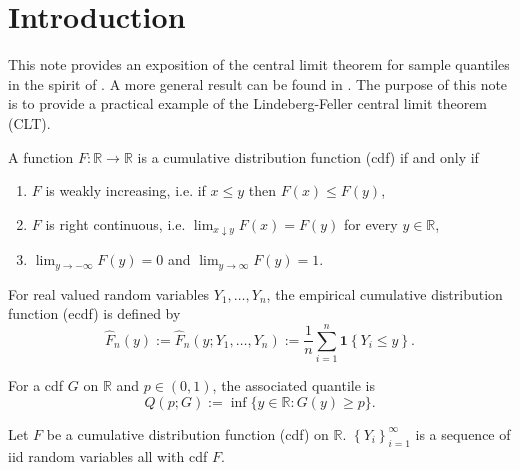 
\section{Introduction}

This note provides an exposition of the central limit theorem for sample
quantiles in the spirit of \citet[Example 24,
p. 53]{1984pollardConvergenceStochasticProcesses}.
A more general result can be found in \citet[Section
2.3.3, pp. 77-84]{1980serflingApproximationTheoremsMathematical}.
The purpose of this note is to provide a practical example of the
Lindeberg-Feller central limit theorem (CLT).

\begin{definition}
A function \(F : \mathbb{R} \to \mathbb{R}\) is a cumulative distribution
function (cdf) if and only if
\begin{enumerate}
  \item \(F\) is weakly increasing, i.e. if \(x \leq y\) then \(F (x) \leq F
    (y)\),
  \item \(F\) is right continuous, i.e. \(\lim_{x \downarrow y} F (x) = F (y)\)
    for every \(y \in \mathbb{R}\),
  \item \(\lim_{y \to - \infty} F (y) = 0\) and \(\lim_{y \to \infty} F (y) =
    1\).
\end{enumerate}
\end{definition}

\begin{definition}
For real valued random variables \(Y_{1}, \dots, Y_{n}\), the empirical
cumulative distribution function (ecdf) is defined by
\begin{equation*}
  \widehat{F}_{n} (y) := \widehat{F}_{n} \left( y; Y_{1}, \dots, Y_{n} \right)
  := \frac{1}{n} \sum_{i = 1}^{n} \mathbf{1} \left\{ Y_{i} \leq y \right\}.
\end{equation*}
\end{definition}

\begin{definition}
For a cdf \(G\) on \(\mathbb{R}\) and \(p \in (0, 1)\), the associated quantile
is
\begin{equation*}
  Q (p; G) := \inf \{y \in \mathbb{R} : G (y) \geq p\}.
\end{equation*}
\end{definition}

\begin{assumption}
\label{asm--iid}
Let \(F\) be a cumulative distribution function (cdf) on \(\mathbb{R}\).
\(\left\{ Y_{i} \right\}_{i = 1}^{\infty}\) is a sequence of iid random
variables all with cdf \(F\).
\end{assumption}


